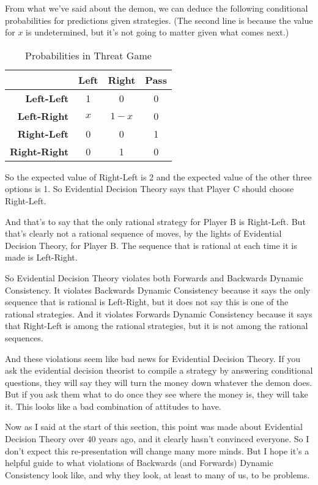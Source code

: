 \documentclass[
  12pt,
]{article}
\begin{document}
From what we've said about the demon, we can deduce the following
conditional probabilities for predictions given strategies. (The second
line is because the value for \(x\) is undetermined, but it's not going
to matter given what comes next.)

\begin{table}[H]

\caption{\label{tab:unnamed-chunk-12}Probabilities in Threat Game}
\centering
\begin{tabular}[t]{>{}r|ccc}

\textbf{} & \textbf{Left} & \textbf{Right} & \textbf{Pass}\\
\midrule
\textbf{Left-Left} & 1 & 0 & 0\\
\textbf{Left-Right} & $x$ & $1-x$ & 0\\
\textbf{Right-Left} & 0 & 0 & 1\\
\textbf{Right-Right} & 0 & 1 & 0\\

\end{tabular}
\end{table}

So the expected value of Right-Left is 2 and the expected value of the
other three options is 1. So Evidential Decision Theory says that Player
C should choose Right-Left.

And that's to say that the only rational strategy for Player B is
Right-Left. But that's clearly not a rational sequence of moves, by the
lights of Evidential Decision Theory, for Player B. The sequence that is
rational at each time it is made is Left-Right.

So Evidential Decision Theory violates both Forwards and Backwards
Dynamic Consistency. It violates Backwards Dynamic Consistency because
it says the only sequence that is rational is Left-Right, but it does
not say this is one of the rational strategies. And it violates Forwards
Dynamic Consistency because it says that Right-Left is among the
rational strategies, but it is not among the rational sequences.

And these violations seem like bad news for Evidential Decision Theory.
If you ask the evidential decision theorist to compile a strategy by
answering conditional questions, they will say they will turn the money
down whatever the demon does. But if you ask them what to do once they
see where the money is, they will take it. This looks like a bad
combination of attitudes to have.

Now as I said at the start of this section, this point was made about
Evidential Decision Theory over 40 years ago, and it clearly hasn't
convinced everyone. So I don't expect this re-presentation will change
many more minds. But I hope it's a helpful guide to what violations of
Backwards (and Forwards) Dynamic Consistency look like, and why they
look, at least to many of us, to be problems.
\end{document}
